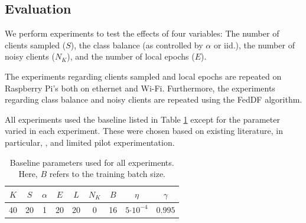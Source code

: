 \documentclass{article}
\newcommand{\ctp}[1]{\ensuremath{\cdot10^{#1}}}
\begin{document}
\subsection{Evaluation}
We perform experiments to test the effects of four variables: The number of clients sampled ($S$), the class balance (as controlled by $\alpha$ or iid.), the number of noisy clients ($N_K$), and the number of local epochs ($E$).

The experiments regarding clients sampled and local epochs are repeated on Raspberry Pi's both on ethernet and Wi-Fi.
Furthermore, the experiments regarding class balance and noisy clients are repeated using the FedDF algorithm.

All experiments used the baseline listed in Table \ref{tab:baseline} except for the parameter varied in each experiment.
These were chosen based on existing literature, in particular, \cite{mcmahan2017communication,lin2020ensemble}, and limited pilot experimentation.

\begin{table}[htb!]
    \centering
    \begin{tabular}{ccccccccc}
        $K$ & $S$ & $\alpha$ & $E$ & $L$ & $N_K$ & $B$ & $\eta$ & $\gamma$\\
        \hline
        40 & 20 & 1 & 20 & 20 & 0 & 16 & $5\ctp{-4}$ & $0.995$
    \end{tabular}
    \caption{Baseline parameters used for all experiments.
        Here, $B$ refers to the training batch size.}
    \label{tab:baseline}
\end{table}
\end{document}
